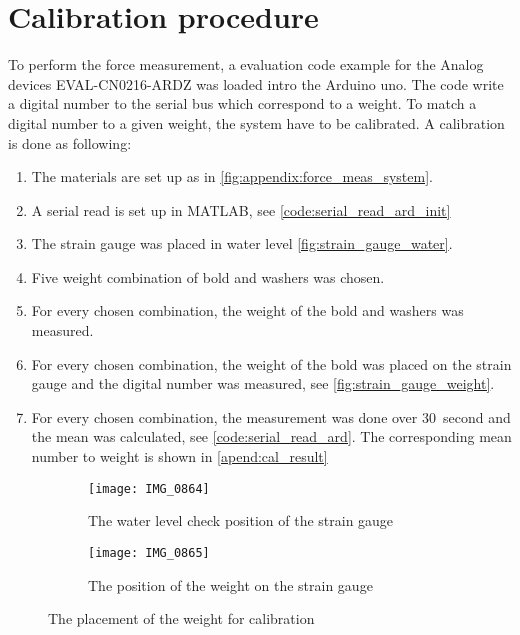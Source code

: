 \section*{Calibration procedure}
To perform the force measurement, a evaluation code example for the Analog devices EVAL-CN0216-ARDZ was loaded intro the Arduino uno. The code write a digital number to the serial bus which correspond to a weight. To match a digital number to a given weight, the system have to be calibrated. A calibration is done as following: 

\begin{enumerate}
\item The materials are set up as in \autoref{fig:appendix:force_meas_system}.
\item A serial read is set up in MATLAB, see \autoref{code:serial_read_ard_init}
\item The strain gauge was placed in water level \autoref{fig:strain_gauge_water}.
\item  Five weight combination of bold and washers was chosen.
\item  For every chosen combination, the weight of the bold and washers was measured.
\item For every chosen combination, the weight of the bold was placed on the strain gauge and the digital number was measured, see \autoref{fig:strain_gauge_weight}. 
\item For every chosen combination, the measurement was done over \SI{30}{second} and the mean was calculated, see \autoref{code:serial_read_ard}. The corresponding mean number to weight is shown in \autoref{apend:cal_result}
\end{enumerate}

\begin{figure}[H]
\centering
\begin{subfigure}[htbp]{0.45\textwidth}
		\texttt{[image: IMG\_0864]}
		\caption{The water level check position of the strain gauge}
		\label{fig:strain_gauge_water}
\end{subfigure}\vspace{10pt}
\begin{subfigure}[htbp]{0.45\textwidth}
		\texttt{[image: IMG\_0865]}
		\caption{The position of the weight on the strain gauge}
		\label{fig:strain_gauge_weight}
\end{subfigure} \hspace{10pt}
\caption{The placement of the weight for calibration}
\label{fig:bc_holder}
\end{figure}


